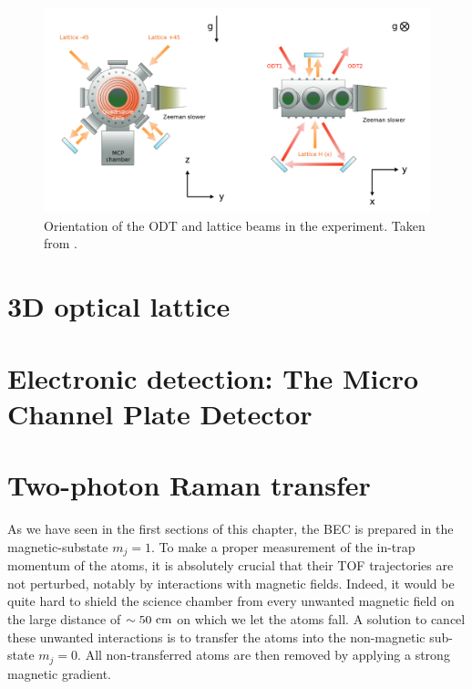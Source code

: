 \begin{figure}
    \centering
    \includegraphics[width=\textwidth]{Fig/Chapter3/scheme_odt_lattice.png}
    \caption{Orientation of the ODT and lattice beams in the experiment. Taken from \cite{cayla_these}.}
    \label{fig:scheme_odt_lattice}
\end{figure}

\section{3D optical lattice}

\section{Electronic detection: The Micro Channel Plate Detector}

\section{Two-photon Raman transfer}

As we have seen in the first sections of this chapter, the BEC is prepared in the magnetic-substate $m_j=1$. To make a proper measurement of the in-trap momentum of the atoms, it is absolutely crucial that their TOF trajectories are not perturbed, notably by interactions with magnetic fields. Indeed, it would be quite hard to shield the science chamber from every unwanted magnetic field on the large distance of $\sim 50 \ \rm{cm}$ on which we let the atoms fall. A solution to cancel these unwanted interactions is to transfer the atoms into the non-magnetic sub-state $m_j=0$. All non-transferred atoms are then removed by applying a strong magnetic gradient.

